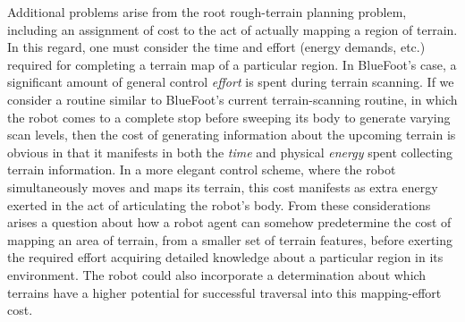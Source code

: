 Additional problems arise from the root rough-terrain planning problem, including an assignment of cost to the act of actually mapping a region of terrain. In this regard, one must consider the time and effort (energy demands, etc.) required for completing a terrain map of a particular region. In BlueFoot's case, a significant amount of general control \emph{effort} is spent during terrain scanning. If we consider a routine similar to BlueFoot's current terrain-scanning routine, in which the robot comes to a complete stop before sweeping its body to generate varying scan levels, then the cost of generating information about the upcoming terrain is obvious in that it manifests in both the \emph{time} and physical \emph{energy} spent collecting terrain information. In a more elegant control scheme, where the robot simultaneously moves and maps its terrain, this cost manifests as extra energy exerted in the act of articulating the robot's body. From these considerations arises a question about how a robot agent can somehow predetermine the cost of mapping an area of terrain, from a smaller set of terrain features, before exerting the required effort acquiring detailed knowledge about a particular region in its environment. The robot could also incorporate a determination about which terrains have a higher potential for successful traversal into this mapping-effort cost. %